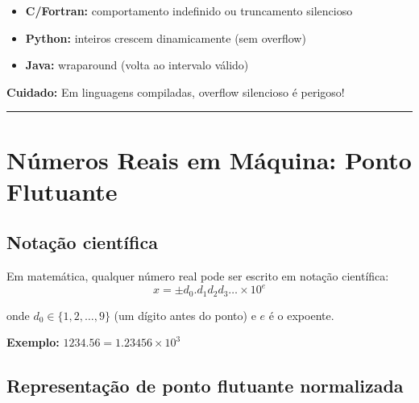 \documentclass[
  11pt,
  letterpaper,
  DIV=11,
  numbers=noendperiod]{scrartcl}
\providecommand{\tightlist}{%
  \setlength{\itemsep}{0pt}\setlength{\parskip}{0pt}}
\begin{document}
\begin{tcolorbox}[enhanced jigsaw, arc=.35mm, bottomrule=.15mm, bottomtitle=1mm, breakable, colback=white, colbacktitle=quarto-callout-warning-color!10!white, colframe=quarto-callout-warning-color-frame, coltitle=black, left=2mm, leftrule=.75mm, opacityback=0, opacitybacktitle=0.6, rightrule=.15mm, title=\textcolor{quarto-callout-warning-color}{\faExclamationTriangle}\hspace{0.5em}{Comportamentos diferentes por linguagem}, titlerule=0mm, toprule=.15mm, toptitle=1mm]

\begin{itemize}
\tightlist
\item
  \textbf{C/Fortran:} comportamento indefinido ou truncamento silencioso
\item
  \textbf{Python:} inteiros crescem dinamicamente (sem overflow)
\item
  \textbf{Java:} wraparound (volta ao intervalo válido)
\end{itemize}

\textbf{Cuidado:} Em linguagens compiladas, overflow silencioso é
perigoso!

\end{tcolorbox}

\begin{center}\rule{0.5\linewidth}{0.5pt}\end{center}

\section{Números Reais em Máquina: Ponto
Flutuante}\label{nuxfameros-reais-em-muxe1quina-ponto-flutuante}

\subsection{Notação científica}\label{notauxe7uxe3o-cientuxedfica}

Em matemática, qualquer número real pode ser escrito em notação
científica: \[x = \pm d_0.d_1 d_2 d_3 \ldots \times 10^e\]

onde \(d_0 \in \{1, 2, \ldots, 9\}\) (um dígito antes do ponto) e \(e\)
é o expoente.

\textbf{Exemplo:} \(1234.56 = 1.23456 \times 10^3\)

\subsection{Representação de ponto flutuante
normalizada}\label{representauxe7uxe3o-de-ponto-flutuante-normalizada}
\end{document}
